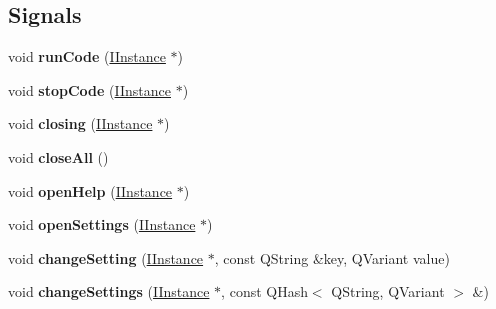 \subsection*{Signals}
\begin{DoxyCompactItemize}
\item 
\hypertarget{classInstances_1_1IInstance_aa1981041a376e4c14ebca95df76cb041}{void {\bfseries run\+Code} (\hyperlink{classInstances_1_1IInstance}{I\+Instance} $\ast$)}\label{classInstances_1_1IInstance_aa1981041a376e4c14ebca95df76cb041}

\item 
\hypertarget{classInstances_1_1IInstance_aa2de904201702d2da2fd8fe9776fcfa5}{void {\bfseries stop\+Code} (\hyperlink{classInstances_1_1IInstance}{I\+Instance} $\ast$)}\label{classInstances_1_1IInstance_aa2de904201702d2da2fd8fe9776fcfa5}

\item 
\hypertarget{classInstances_1_1IInstance_acf3c3769af5448b3093e42b73e01c7e6}{void {\bfseries closing} (\hyperlink{classInstances_1_1IInstance}{I\+Instance} $\ast$)}\label{classInstances_1_1IInstance_acf3c3769af5448b3093e42b73e01c7e6}

\item 
\hypertarget{classInstances_1_1IInstance_a6f3b9855e287de954554c631bd7c0a8b}{void {\bfseries close\+All} ()}\label{classInstances_1_1IInstance_a6f3b9855e287de954554c631bd7c0a8b}

\item 
\hypertarget{classInstances_1_1IInstance_aea2d89deb68d4ba6d5833e03ff6a48dc}{void {\bfseries open\+Help} (\hyperlink{classInstances_1_1IInstance}{I\+Instance} $\ast$)}\label{classInstances_1_1IInstance_aea2d89deb68d4ba6d5833e03ff6a48dc}

\item 
\hypertarget{classInstances_1_1IInstance_a1864f99f3c54f539980c3e1a2ab2164d}{void {\bfseries open\+Settings} (\hyperlink{classInstances_1_1IInstance}{I\+Instance} $\ast$)}\label{classInstances_1_1IInstance_a1864f99f3c54f539980c3e1a2ab2164d}

\item 
\hypertarget{classInstances_1_1IInstance_a9ecdadd405b81e04a2b052b30efd6b9f}{void {\bfseries change\+Setting} (\hyperlink{classInstances_1_1IInstance}{I\+Instance} $\ast$, const Q\+String \&key, Q\+Variant value)}\label{classInstances_1_1IInstance_a9ecdadd405b81e04a2b052b30efd6b9f}

\item 
\hypertarget{classInstances_1_1IInstance_a4efdf11046ad14aaa6422dfe6eca761d}{void {\bfseries change\+Settings} (\hyperlink{classInstances_1_1IInstance}{I\+Instance} $\ast$, const Q\+Hash$<$ Q\+String, Q\+Variant $>$ \&)}\label{classInstances_1_1IInstance_a4efdf11046ad14aaa6422dfe6eca761d}


\end{DoxyCompactItemize}
